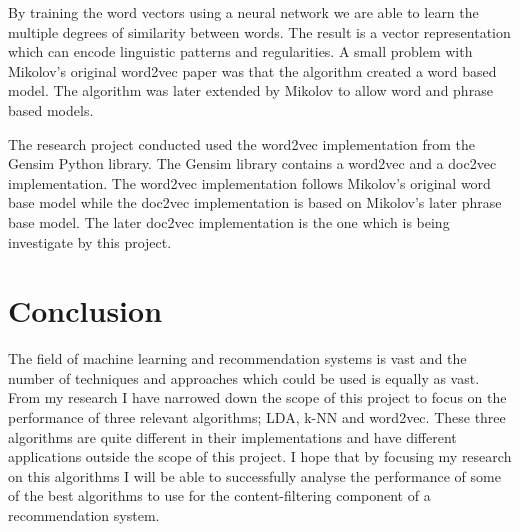 By training the word vectors using a neural network we are able to learn the multiple degrees of similarity between words\cite{Mikolov1}.
The result is a vector representation which can encode linguistic patterns and regularities.\cite{Mikolov2}
A small problem with Mikolov's original word2vec paper was that the algorithm created a word based model.
The algorithm was later extended by Mikolov to allow word and phrase based models.\cite{Mikolov2}

The research project conducted used the word2vec implementation from the Gensim Python library.
The Gensim library contains a word2vec and a doc2vec implementation. The word2vec implementation follows Mikolov's original word base model while the doc2vec implementation is based on Mikolov's later phrase base model.\cite{radimDoc2Vec}
The later doc2vec implementation is the one which is being investigate by this project.


\section{Conclusion}
The field of machine learning and recommendation systems is vast and the number of techniques and approaches which could be used is equally as vast.
From my research I have narrowed down the scope of this project to focus on the performance of three relevant algorithms; LDA, k-NN and word2vec.
These three algorithms are quite different in their implementations and have different applications outside the scope of this project.
I hope that by focusing my research on this algorithms I will be able to successfully analyse the performance of some of the best algorithms to use for the content-filtering component of a recommendation system.
